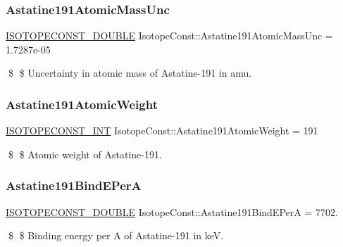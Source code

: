 \subsubsection{\texorpdfstring{Astatine191\+Atomic\+Mass\+Unc}{Astatine191AtomicMassUnc}}
{\footnotesize\ttfamily \mbox{\hyperlink{group___isotope_const-_macros_ga8f45a7272ce02c0b4c65c44636ed719a}{I\+S\+O\+T\+O\+P\+E\+C\+O\+N\+S\+T\+\_\+\+D\+O\+U\+B\+LE}} Isotope\+Const\+::\+Astatine191\+Atomic\+Mass\+Unc = 1.\+7287e-\/05}

\$ \$ Uncertainty in atomic mass of Astatine-\/191 in amu. \mbox{\label{group___isotope_const-_astatine-_at191_gad53387889eaa28b1d75cf6107b710578}} 
\subsubsection{\texorpdfstring{Astatine191\+Atomic\+Weight}{Astatine191AtomicWeight}}
{\footnotesize\ttfamily \mbox{\hyperlink{group___isotope_const-_macros_ga5f18360b3e99483a35c32d789e62621c}{I\+S\+O\+T\+O\+P\+E\+C\+O\+N\+S\+T\+\_\+\+I\+NT}} Isotope\+Const\+::\+Astatine191\+Atomic\+Weight = 191}

\$ \$ Atomic weight of Astatine-\/191. \mbox{\label{group___isotope_const-_astatine-_at191_ga8e5c5fa80c241cbbc205228bdcdaadeb}} 
\subsubsection{\texorpdfstring{Astatine191\+Bind\+E\+PerA}{Astatine191BindEPerA}}
{\footnotesize\ttfamily \mbox{\hyperlink{group___isotope_const-_macros_ga8f45a7272ce02c0b4c65c44636ed719a}{I\+S\+O\+T\+O\+P\+E\+C\+O\+N\+S\+T\+\_\+\+D\+O\+U\+B\+LE}} Isotope\+Const\+::\+Astatine191\+Bind\+E\+PerA = 7702.}

\$ \$ Binding energy per A of Astatine-\/191 in keV. \mbox{\label{group___isotope_const-_astatine-_at191_ga8205d99b1f5570d8992b955c34a6d73f}} 
